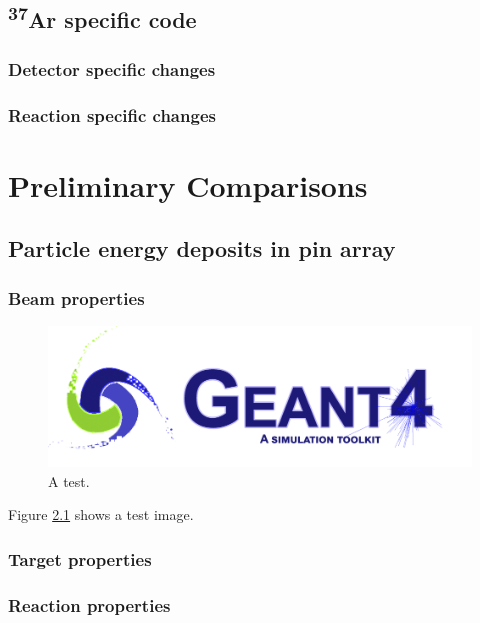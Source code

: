 \documentclass[utf8,bachelor,english,draft]{gradu3}
\begin{document}
    \section{\textsuperscript{37}Ar specific code}
        \subsection{Detector specific changes}
        \subsection{Reaction specific changes}

\chapter{Preliminary Comparisons}
    \section{Particle energy deposits in pin array}
        \subsection{Beam properties}
            \begin{figure}[h!]
                \includegraphics[width=\linewidth]{test.png}
                \caption{A test.}
                \label{fig:test1}
            \end{figure}

        Figure \ref{fig:test1} shows a test image.
        
        \subsection{Target properties}
        \subsection{Reaction properties}
        
\end{document}
